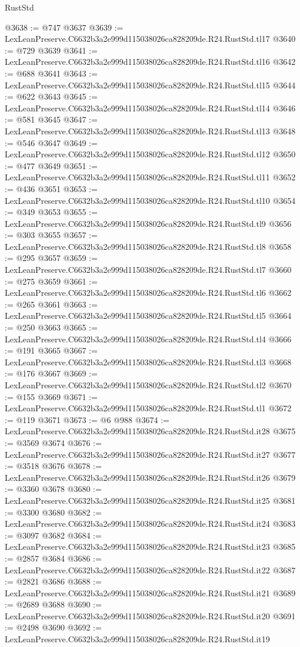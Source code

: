 \begin{lexlean}{RustStd}
\begin{coremodule}
@3638 := @747 @3637
@3639 := LexLeanPreserve.C6632b3a2e999d115038026ca828209de.R24.RustStd.tl17
@3640 := @729 @3639
@3641 := LexLeanPreserve.C6632b3a2e999d115038026ca828209de.R24.RustStd.tl16
@3642 := @688 @3641
@3643 := LexLeanPreserve.C6632b3a2e999d115038026ca828209de.R24.RustStd.tl15
@3644 := @622 @3643
@3645 := LexLeanPreserve.C6632b3a2e999d115038026ca828209de.R24.RustStd.tl14
@3646 := @581 @3645
@3647 := LexLeanPreserve.C6632b3a2e999d115038026ca828209de.R24.RustStd.tl13
@3648 := @546 @3647
@3649 := LexLeanPreserve.C6632b3a2e999d115038026ca828209de.R24.RustStd.tl12
@3650 := @477 @3649
@3651 := LexLeanPreserve.C6632b3a2e999d115038026ca828209de.R24.RustStd.tl11
@3652 := @436 @3651
@3653 := LexLeanPreserve.C6632b3a2e999d115038026ca828209de.R24.RustStd.tl10
@3654 := @349 @3653
@3655 := LexLeanPreserve.C6632b3a2e999d115038026ca828209de.R24.RustStd.tl9
@3656 := @303 @3655
@3657 := LexLeanPreserve.C6632b3a2e999d115038026ca828209de.R24.RustStd.tl8
@3658 := @295 @3657
@3659 := LexLeanPreserve.C6632b3a2e999d115038026ca828209de.R24.RustStd.tl7
@3660 := @275 @3659
@3661 := LexLeanPreserve.C6632b3a2e999d115038026ca828209de.R24.RustStd.tl6
@3662 := @265 @3661
@3663 := LexLeanPreserve.C6632b3a2e999d115038026ca828209de.R24.RustStd.tl5
@3664 := @250 @3663
@3665 := LexLeanPreserve.C6632b3a2e999d115038026ca828209de.R24.RustStd.tl4
@3666 := @191 @3665
@3667 := LexLeanPreserve.C6632b3a2e999d115038026ca828209de.R24.RustStd.tl3
@3668 := @176 @3667
@3669 := LexLeanPreserve.C6632b3a2e999d115038026ca828209de.R24.RustStd.tl2
@3670 := @155 @3669
@3671 := LexLeanPreserve.C6632b3a2e999d115038026ca828209de.R24.RustStd.tl1
@3672 := @119 @3671
@3673 := @6 @988
@3674 := LexLeanPreserve.C6632b3a2e999d115038026ca828209de.R24.RustStd.it28
@3675 := @3569 @3674
@3676 := LexLeanPreserve.C6632b3a2e999d115038026ca828209de.R24.RustStd.it27
@3677 := @3518 @3676
@3678 := LexLeanPreserve.C6632b3a2e999d115038026ca828209de.R24.RustStd.it26
@3679 := @3360 @3678
@3680 := LexLeanPreserve.C6632b3a2e999d115038026ca828209de.R24.RustStd.it25
@3681 := @3300 @3680
@3682 := LexLeanPreserve.C6632b3a2e999d115038026ca828209de.R24.RustStd.it24
@3683 := @3097 @3682
@3684 := LexLeanPreserve.C6632b3a2e999d115038026ca828209de.R24.RustStd.it23
@3685 := @2857 @3684
@3686 := LexLeanPreserve.C6632b3a2e999d115038026ca828209de.R24.RustStd.it22
@3687 := @2821 @3686
@3688 := LexLeanPreserve.C6632b3a2e999d115038026ca828209de.R24.RustStd.it21
@3689 := @2689 @3688
@3690 := LexLeanPreserve.C6632b3a2e999d115038026ca828209de.R24.RustStd.it20
@3691 := @2498 @3690
@3692 := LexLeanPreserve.C6632b3a2e999d115038026ca828209de.R24.RustStd.it19

\end{coremodule}
\end{lexlean}
